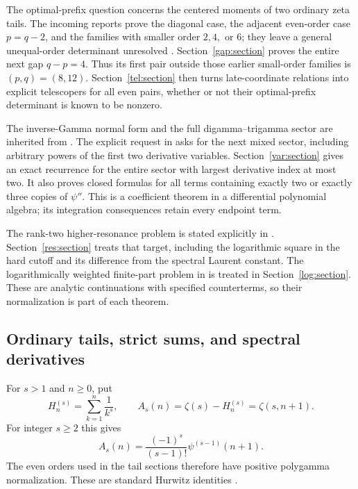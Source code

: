 \documentclass[11pt,letterpaper]{article}
\numberwithin{equation}{section}
\theoremstyle{plain}
\theoremstyle{definition}
\theoremstyle{remark}
\begin{document}
The optimal-prefix question concerns the centered moments of two
ordinary zeta tails. The incoming reports prove the diagonal case,
the adjacent even-order case $p=q-2$, and the families with smaller
order $2,4,$ or $6$; they leave a general unequal-order determinant
unresolved \cite{BTD,DPL,PTI}. Section~\ref{gap:section} proves the
entire next gap $q-p=4$. Thus its first pair outside those earlier
small-order families is $(p,q)=(8,12)$. Section~\ref{tel:section}
then turns late-coordinate relations into explicit telescopers for
all even pairs, whether or not their optimal-prefix determinant is
known to be nonzero.

The inverse-Gamma normal form and the full digamma--trigamma sector
are inherited from \cite{DPL,PTI}. The explicit request in
\cite[research questions 4--5]{PTI} asks for the next mixed sector,
including arbitrary powers of the first two derivative variables.
Section~\ref{var:section} gives an exact recurrence for the entire
sector with largest derivative index at most two. It also proves
closed formulas for all terms containing exactly two or exactly three
copies of $\psi''$. This is a coefficient theorem in a differential
polynomial algebra; its integration consequences retain every endpoint
term.

The rank-two higher-resonance problem is stated explicitly in
\cite[Section 9]{DHR}. Section~\ref{res:section} treats that target,
including the logarithmic square in the hard cutoff and its difference
from the spectral Laurent constant. The logarithmically weighted
finite-part problem in \cite{DPL} is treated in
Section~\ref{log:section}. These are analytic continuations with
specified counterterms, so their normalization is part of each theorem.

\subsection{Ordinary tails, strict sums, and spectral derivatives}

For $s>1$ and $n\ge0$, put
\begin{equation}\label{scope:tails}
 H_n^{(s)}=\sum_{k=1}^n\frac1{k^s},\qquad
 A_s(n)=\zeta(s)-H_n^{(s)}=\zeta(s,n+1).
\end{equation}
For integer $s\ge2$ this gives
\[
 A_s(n)=\frac{(-1)^s}{(s-1)!}\psi^{(s-1)}(n+1).
\]
The even orders used in the tail sections therefore have positive
polygamma normalization. These are standard Hurwitz identities
\cite[Sections 5.15 and 25.11]{DLMF}.
\end{document}
